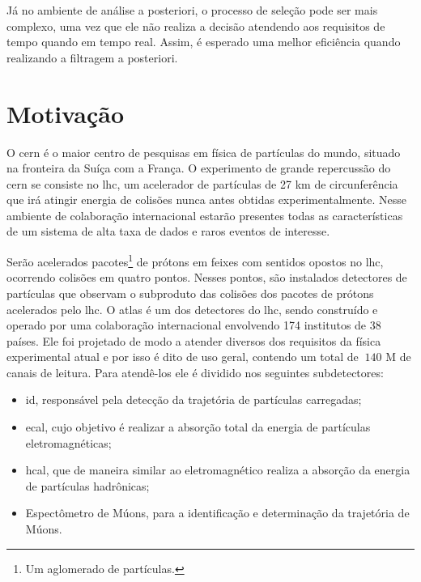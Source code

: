 Já no ambiente de análise a posteriori, o processo de seleção pode ser mais
complexo, uma vez que ele não realiza a decisão atendendo aos
requisitos de tempo quando em tempo real. Assim, é esperado 
uma melhor eficiência quando realizando a filtragem a posteriori.

\section{Motivação}

O \gls{cern} é o maior centro de
pesquisas em física de partículas do mundo, situado na fronteira da Suíça com a
França. O experimento de grande repercussão do \gls{cern} se
consiste no \gls{lhc}, um acelerador de partículas de 27 km de
circunferência que irá atingir energia de colisões nunca antes obtidas
experimentalmente. 
Nesse ambiente de colaboração internacional estarão presentes
todas as características de um sistema de alta taxa de dados e raros eventos de
interesse.

Serão acelerados pacotes\footnote{Um aglomerado de partículas.} de prótons em
feixes com sentidos opostos no \gls{lhc},
ocorrendo colisões em quatro pontos. Nesses pontos, são instalados 
detectores de partículas que observam o subproduto das colisões dos pacotes de prótons 
acelerados pelo \gls{lhc}. O \gls{atlas} é um dos detectores do
\gls{lhc}, sendo construído e operado por uma colaboração internacional envolvendo 174 institutos de 38
países. Ele foi projetado de modo a atender diversos dos requisitos da física 
experimental atual e por isso é dito de uso geral, contendo um total de $~140$ M 
de canais de leitura. Para atendê-los ele é dividido nos seguintes subdetectores:


\begin{itemize}
\item \gls{id}, responsável pela detecção da trajetória de partículas carregadas;
\item \gls{ecal}, cujo objetivo é realizar a absorção total da
energia de partículas eletromagnéticas;
\item \gls{hcal}, que de maneira similar ao eletromagnético realiza a
absorção da energia de partículas hadrônicas;
\item Espectômetro de Múons, para a identificação e determinação da trajetória de
Múons.
\end{itemize}

